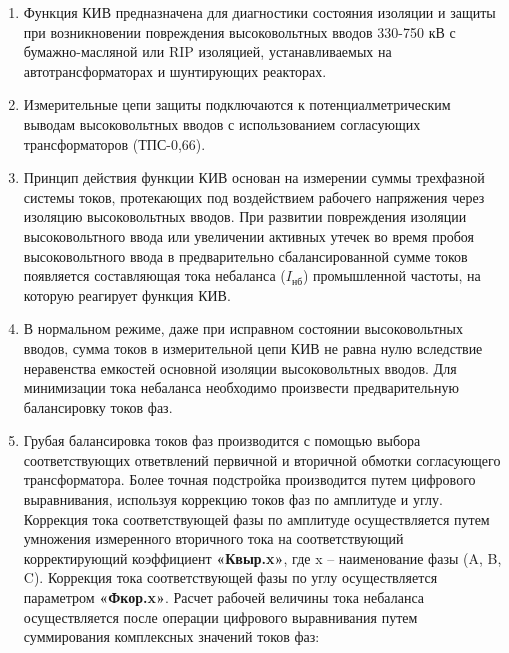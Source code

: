 \color{black}

\begin{enumerate}[label=\arabic{section}.\arabic{subsection}.\arabic*,  align=left, labelsep=4pt, leftmargin=0pt, itemindent=57pt]

\item
Функция КИВ предназначена для диагностики состояния изоляции и защиты при возникновении
повреждения высоковольтных вводов 330-750 кВ с бумажно-масляной или RIP изоляцией,
устанавливаемых на автотрансформаторах и шунтирующих реакторах.

\item
Измерительные цепи защиты подключаются к потенциалметрическим выводам высоковольтных
вводов с использованием согласующих трансформаторов (ТПС-0,66).

\item
Принцип действия функции КИВ основан на измерении суммы трехфазной системы токов,
протекающих под воздействием рабочего напряжения через изоляцию высоковольтных вводов. При
развитии повреждения изоляции высоковольтного ввода или увеличении активных утечек во время
пробоя высоковольтного ввода в предварительно сбалансированной сумме токов появляется
составляющая тока небаланса ($I_{\text{нб}}$) промышленной частоты, на которую реагирует функция КИВ.

\item
В нормальном режиме, даже при исправном состоянии высоковольтных вводов, сумма токов в
измерительной цепи КИВ не равна нулю вследствие неравенства емкостей основной изоляции
высоковольтных вводов. Для минимизации тока небаланса необходимо произвести предварительную
балансировку токов фаз.

\item
Грубая балансировка токов фаз производится с помощью выбора соответствующих ответвлений
первичной и вторичной обмотки согласующего трансформатора. Более точная подстройка производится
путем цифрового выравнивания, используя коррекцию токов фаз по амплитуде и углу. Коррекция тока
соответствующей фазы по амплитуде осуществляется путем умножения измеренного вторичного тока
на соответствующий корректирующий коэффициент \textbf{«Квыр.x»}, где x – наименование фазы (A, B, C).
Коррекция тока соответствующей фазы по углу осуществляется параметром \textbf{«Фкор.x»}. Расчет рабочей
величины тока небаланса осуществляется после операции цифрового выравнивания путем
суммирования комплексных значений токов фаз:


\end{enumerate}
